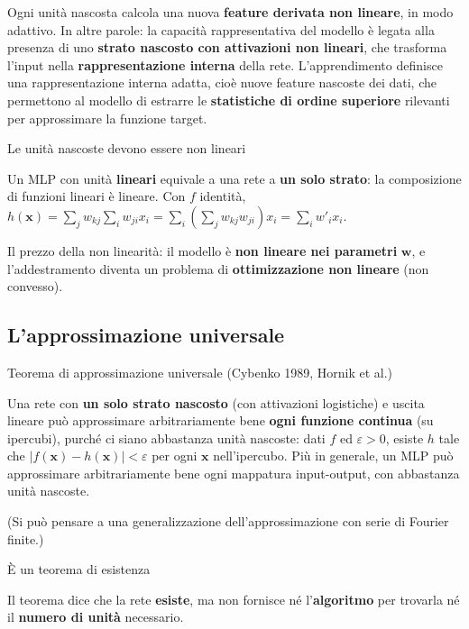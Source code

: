 Ogni unità nascosta calcola una nuova \textbf{feature derivata non
lineare}, in modo adattivo. In altre parole: la capacità rappresentativa
del modello è legata alla presenza di uno \textbf{strato nascosto con
attivazioni non lineari}, che trasforma l'input nella
\textbf{rappresentazione interna} della rete. L'apprendimento definisce
una rappresentazione interna adatta, cioè nuove feature nascoste dei
dati, che permettono al modello di estrarre le \textbf{statistiche di
ordine superiore} rilevanti per approssimare la funzione target.

\begin{boxwarning}{Le unità nascoste devono essere non lineari}

Un MLP con unità \textbf{lineari} equivale a una rete a \textbf{un solo
strato}: la composizione di funzioni lineari è lineare. Con \(f\)
identità,
\(h(\mathbf{x}) = \sum_j w_{kj}\sum_i w_{ji}x_i = \sum_i\left(\sum_j w_{kj}w_{ji}\right)x_i = \sum_i w'_i x_i\).

Il prezzo della non linearità: il modello è \textbf{non lineare nei
parametri} \(\mathbf{w}\), e l'addestramento diventa un problema di
\textbf{ottimizzazione non lineare} (non convesso).

\end{boxwarning}

\subsection{L'approssimazione
universale}\label{lapprossimazione-universale}

\begin{boxtheorem}{Teorema di approssimazione universale (Cybenko 1989, Hornik et al.)}

Una rete con \textbf{un solo strato nascosto} (con attivazioni
logistiche) e uscita lineare può approssimare arbitrariamente bene
\textbf{ogni funzione continua} (su ipercubi), purché ci siano
abbastanza unità nascoste: dati \(f\) ed \(\varepsilon > 0\), esiste
\(h\) tale che \(|f(\mathbf{x}) - h(\mathbf{x})| < \varepsilon\) per
ogni \(\mathbf{x}\) nell'ipercubo. Più in generale, un MLP può
approssimare arbitrariamente bene ogni mappatura input-output, con
abbastanza unità nascoste.

\end{boxtheorem}

(Si può pensare a una generalizzazione dell'approssimazione con serie di
Fourier finite.)

\begin{boxwarning}{È un teorema di esistenza}

Il teorema dice che la rete \textbf{esiste}, ma non fornisce né
l'\textbf{algoritmo} per trovarla né il \textbf{numero di unità}
necessario.

\end{boxwarning}

